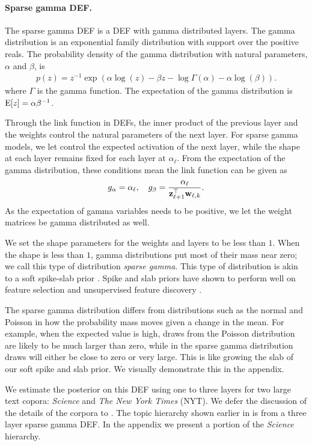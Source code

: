 \documentclass[twoside]{article}
\begin{document}
\paragraph{Sparse gamma DEF.}
The sparse gamma DEF is a DEF with gamma distributed layers.
The gamma distribution is an exponential family distribution 
with support over the positive reals.
The probability density of the gamma distribution 
with natural parameters, $\alpha$ and $\beta$, is
\begin{align*}
p(z) = z^{-1}\exp(\alpha \log(z) - \beta z - \log \Gamma(\alpha) - \alpha  \log(\beta)).
\end{align*}
where $\Gamma$ is the gamma function. The expectation of the gamma distribution is
$\textrm{E}[z] = \alpha \beta^{-1}$.

Through the link function in DEFs, the inner product of the previous layer and 
the weights control the natural parameters of the next layer. 
For sparse gamma models, we let control the expected
activation of the next layer, while the shape at each layer remains fixed for each
layer at $\alpha_\ell$. From the expectation of the gamma distribution, these conditions mean
the link function can be given as
\begin{align*}
g_\alpha = \alpha_\ell, \quad
g_\beta = \frac{\alpha_\ell}{\boldsymbol{\mathbf{z}}_{\ell+1}^\top \boldsymbol{\mathbf{w}}_{\ell,k}}.
\end{align*}
As the expectation of gamma variables needs to be positive, we let the weight matrices 
be gamma distributed as well.

We set the shape parameters for the weights and layers to be less than $1$.
When the shape is less than $1$, gamma distributions 
put most of their mass near zero; we call this type of distribution \emph{sparse gamma}. 
This type of distribution is akin to a soft spike-slab prior \citep{Ishwaran:2005}. 
Spike and slab priors have shown to perform well on feature selection
and unsupervised feature discovery \citep{Goodfellow:2012, Hernandez:2013}.

The sparse gamma distribution differs from distributions such as the normal and Poisson
in how the probability mass moves given a change in the mean.
For example, when the expected value is high, draws from the Poisson distribution
are likely to be much larger than zero, while in the sparse gamma distribution
draws will either be close to zero or very large.
This is 
like growing the slab of our soft spike and slab prior.
We visually demonstrate this in the appendix.

We estimate the posterior on this DEF using one to three layers for two large text copora: \emph{Science} and
\emph{The New York Times} (NYT). We defer the discussion of the details of the corpora to . The topic hierarchy shown earlier in  is from a three layer
sparse gamma DEF. 
In the appendix we present a portion of the \emph{Science} hierarchy.
\end{document}

